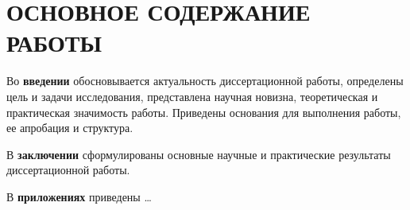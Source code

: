 
\section*{ОСНОВНОЕ СОДЕРЖАНИЕ РАБОТЫ}
Во {\bf введении} 
обосновывается актуальность диссертационной работы, 
определены цель и задачи исследования, 
представлена научная новизна, теоретическая и практическая значимость работы. 
Приведены основания для выполнения работы, ее апробация и структура.







В {\bf заключении} 
сформулированы основные научные и практические результаты
диссертационной работы.

В {\bf приложениях} 
приведены \dots

